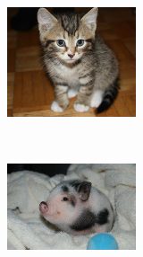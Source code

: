 \documentclass[11pt]{exam}
\begin{document}
\begin{questions}
\begin{figure}[h]
    \centering
    \begin{subfigure}[b]{0.3\textwidth}
        \includegraphics[width=\textwidth]{cute1}
        \caption{\underline{\hspace{2cm}}} 
        \label{fig:anzu}
    \end{subfigure}
    ~ %
    \begin{subfigure}[b]{0.3\textwidth}
        \includegraphics[width=\textwidth]{cute2}
        \caption{\underline{\hspace{2cm}}} 

\end{subfigure}
\end{figure}
\end{questions}
\end{document}
